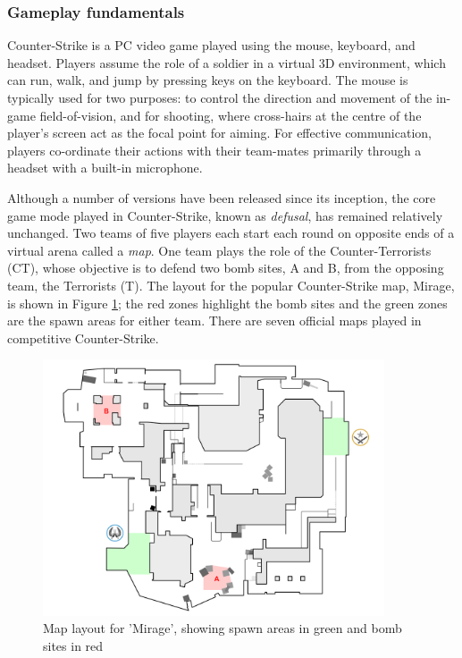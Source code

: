 \subsubsection{Gameplay fundamentals}

Counter-Strike is a PC video game played using the mouse, keyboard, and headset. Players assume the role of a soldier in a virtual 3D environment, which can run, walk, and jump by pressing keys on the keyboard. The mouse is typically used for two purposes: to control the direction and movement of the in-game field-of-vision, and for shooting, where cross-hairs at the centre of the player's screen act as the focal point for aiming. For effective communication, players co-ordinate their actions with their team-mates primarily through a headset with a built-in microphone. 

Although a number of versions have been released since its inception, the core game mode played in Counter-Strike, known as \textit{defusal}, has remained relatively unchanged. Two teams of five players each start each round on opposite ends of a virtual arena called a \textit{map}. One team plays the role of the Counter-Terrorists (CT), whose objective is to defend two bomb sites, A and B, from the opposing team, the Terrorists (T). The layout for the popular Counter-Strike map, Mirage, is shown in Figure \ref{fig:mirage}; the red zones highlight the bomb sites and the green zones are the spawn areas for either team. There are seven official maps played in competitive Counter-Strike.

\begin{figure}[h]
	\centering
	\includegraphics[width=0.9\textwidth]{Figures/mirage.png}
	\caption{Map layout for 'Mirage', showing spawn areas in green and bomb sites in red \cite{mapdiagram}}
	\label{fig:mirage}
\end{figure}


